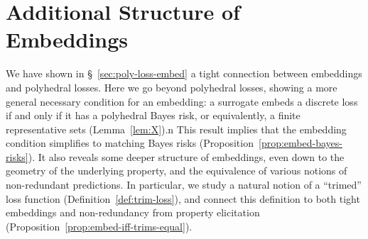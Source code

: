 \documentclass[11pt]{article}
\newcommand{\Comments}{1}
\newcommand{\mynote}[2]{\ifnum\Comments=1\textcolor{#1}{#2}\fi}
\newcommand{\mytodo}[2]{\ifnum\Comments=1%
  \todo[linecolor=#1!80!black,backgroundcolor=#1,bordercolor=#1!80!black]{#2}\fi}
\newcommand{\raf}[1]{\mynote{darkgreen}{[RF: #1]}}
\newcommand{\jessie}[1]{\mynote{teal}{[JF: #1]}}
\newcommand{\jessiet}[1]{\mytodo{teal!20!white}{JF: #1}}
\newcommand{\prop}[1]{\mathrm{prop}[#1]}
\newcommand{\simplex}{\Delta_\Y}
\newcommand{\Y}{\mathcal{Y}}
\newcommand{\inprod}[2]{\langle #1, #2 \rangle}%
\newcommand{\elltopk}{\ell^{\text{top-$k$}}}
\begin{document}
%
%
%
%





\section{Additional Structure of Embeddings}
\label{sec:min-rep-sets}

We have shown in \S~\ref{sec:poly-loss-embed} a tight connection between embeddings and polyhedral losses.
Here we go beyond polyhedral losses, showing a more general necessary condition for an embedding: a surrogate embeds a discrete loss if and only if it has a polyhedral Bayes risk, or equivalently, a finite representative sets (Lemma~\ref{lem:X}).n
This result implies that the embedding condition simplifies to matching Bayes risks (Proposition~\ref{prop:embed-bayes-risks}).
It also reveals some deeper structure of embeddings, even down to the geometry of the underlying property, and the equivalence of various notions of non-redundant predictions.
In particular, we study a natural notion of a ``trimed'' loss function (Definition~\ref{def:trim-loss}), and connect this definition to both tight embeddings and non-redundancy from property elicitation (Proposition~\ref{prop:embed-iff-trims-equal}).
 

\end{document}
